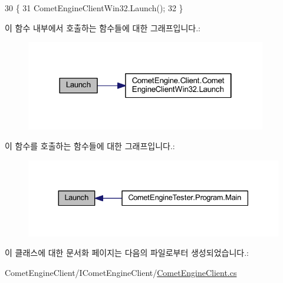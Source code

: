 \begin{DoxyCode}
30         \{
31             CometEngineClientWin32.Launch();
32         \}
\end{DoxyCode}
이 함수 내부에서 호출하는 함수들에 대한 그래프입니다.\+:\nopagebreak
\begin{figure}[H]
\begin{center}
\leavevmode
\includegraphics[width=298pt]{class_comet_engine_1_1_client_1_1_comet_engine_client_aee7b13887a71ba1fcd42c5fbccf124d4_cgraph}
\end{center}
\end{figure}
이 함수를 호출하는 함수들에 대한 그래프입니다.\+:\nopagebreak
\begin{figure}[H]
\begin{center}
\leavevmode
\includegraphics[width=330pt]{class_comet_engine_1_1_client_1_1_comet_engine_client_aee7b13887a71ba1fcd42c5fbccf124d4_icgraph}
\end{center}
\end{figure}


이 클래스에 대한 문서화 페이지는 다음의 파일로부터 생성되었습니다.\+:\begin{DoxyCompactItemize}
\item 
Comet\+Engine\+Client/\+I\+Comet\+Engine\+Client/\hyperlink{_comet_engine_client_8cs}{Comet\+Engine\+Client.\+cs}\end{DoxyCompactItemize}
